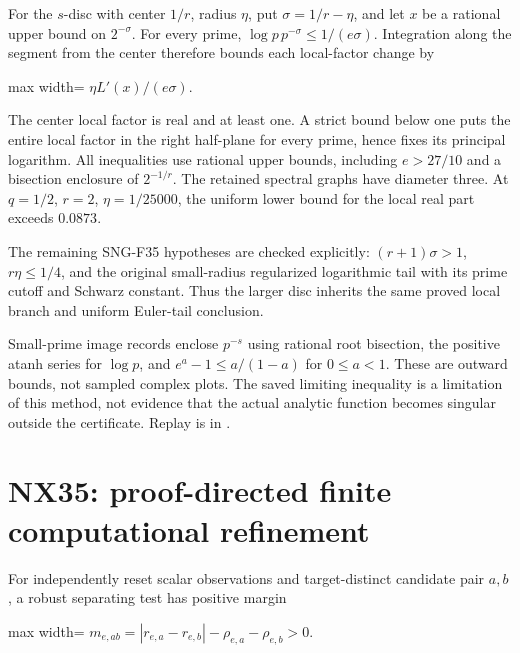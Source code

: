 \documentclass[
  11pt,
  a4paper,
]{report}
\let\singularitytexttt\texttt
\renewcommand{\texttt}[1]{\singularitytexttt{\seqsplit{#1}}}
\begin{document}
For the \(s\)-disc with center \(1/r\), radius \(\eta\), put
\(\sigma=1/r-\eta\), and let \(x\) be a rational upper bound on
\(2^{-\sigma}\). For every prime, \(\log p\,p^{-\sigma}\le1/(e\sigma)\).
Integration along the segment from the center therefore bounds each
local-factor change by

\begin{center}
\begin{adjustbox}{max width=\linewidth}
$\displaystyle
\eta L'(x)/(e\sigma).
$
\end{adjustbox}
\end{center}

The center local factor is real and at least one. A strict bound below
one puts the entire local factor in the right half-plane for every
prime, hence fixes its principal logarithm. All inequalities use
rational upper bounds, including \(e>27/10\) and a bisection enclosure
of \(2^{-1/r}\). The retained spectral graphs have diameter three. At
\(q=1/2\), \(r=2\), \(\eta=1/25000\), the uniform lower bound for the
local real part exceeds \(0.0873\).

The remaining SNG-F35 hypotheses are checked explicitly:
\((r+1)\sigma>1\), \(r\eta\le1/4\), and the original small-radius
regularized logarithmic tail with its prime cutoff and Schwarz constant.
Thus the larger disc inherits the same proved local branch and uniform
Euler-tail conclusion.

Small-prime image records enclose \(p^{-s}\) using rational root
bisection, the positive atanh series for \(\log p\), and
\(e^a-1\le a/(1-a)\) for \(0\le a<1\). These are outward bounds, not
sampled complex plots. The saved limiting inequality is a limitation of
this method, not evidence that the actual analytic function becomes
singular outside the certificate. Replay is in
\texttt{results/nx36/nx34\_acceptance.json}.

\hypertarget{nx35-proof-directed-finite-computational-refinement}{%
\chapter{NX35: proof-directed finite computational
refinement}\label{nx35-proof-directed-finite-computational-refinement}}

For independently reset scalar observations and target-distinct
candidate pair \(a,b\), a robust separating test has positive margin

\begin{center}
\begin{adjustbox}{max width=\linewidth}
$\displaystyle
m_{e,ab}=|r_{e,a}-r_{e,b}|-\rho_{e,a}-\rho_{e,b}>0.
$
\end{adjustbox}
\end{center}
\end{document}
